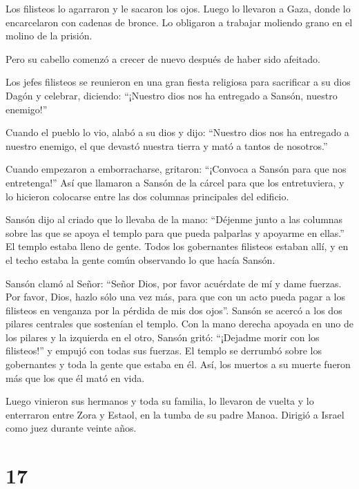  Los filisteos lo agarraron y le sacaron los ojos. Luego lo
llevaron a Gaza, donde lo encarcelaron con cadenas de bronce. Lo
obligaron a trabajar moliendo grano en el molino de la prisión.

 Pero su cabello comenzó a crecer de nuevo después de haber
sido afeitado.

 Los jefes filisteos se reunieron en una gran fiesta
religiosa para sacrificar a su dios Dagón y celebrar, diciendo:
``¡Nuestro dios nos ha entregado a Sansón, nuestro enemigo!''

 Cuando el pueblo lo vio, alabó a su dios y dijo: ``Nuestro
dios nos ha entregado a nuestro enemigo, el que devastó nuestra tierra y
mató a tantos de nosotros.''

 Cuando empezaron a emborracharse, gritaron: ``¡Convoca a
Sansón para que nos entretenga!'' Así que llamaron a Sansón de la cárcel
para que los entretuviera, y lo hicieron colocarse entre las dos
columnas principales del edificio.

 Sansón dijo al criado que lo llevaba de la mano: ``Déjenme
junto a las columnas sobre las que se apoya el templo para que pueda
palparlas y apoyarme en ellas.''  El templo estaba lleno de
gente. Todos los gobernantes filisteos estaban allí, y en el techo
estaba la gente común observando lo que hacía Sansón.

 Sansón clamó al Señor: ``Señor Dios, por favor acuérdate
de mí y dame fuerzas. Por favor, Dios, hazlo sólo una vez más, para que
con un acto pueda pagar a los filisteos en venganza por la pérdida de
mis dos ojos''.  Sansón se acercó a los dos pilares
centrales que sostenían el templo. Con la mano derecha apoyada en uno de
los pilares y la izquierda en el otro,  Sansón gritó:
``¡Dejadme morir con los filisteos!'' y empujó con todas sus fuerzas. El
templo se derrumbó sobre los gobernantes y toda la gente que estaba en
él. Así, los muertos a su muerte fueron más que los que él mató en vida.

 Luego vinieron sus hermanos y toda su familia, lo llevaron
de vuelta y lo enterraron entre Zora y Estaol, en la tumba de su padre
Manoa. Dirigió a Israel como juez durante veinte años.

\hypertarget{section-16}{%
\section{17}\label{section-16}}

